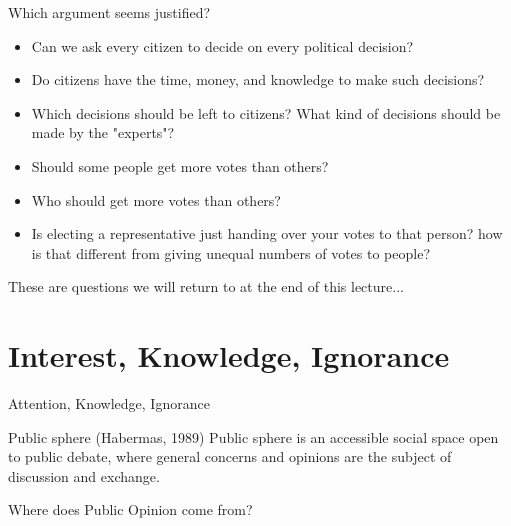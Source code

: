 \documentclass{beamer}
\begin{document}
\begin{frame}{Which argument seems justified? }
\begin{itemize}
    \item Can we ask every citizen to decide on every political decision?
    \item Do citizens have the time,  money, and knowledge to make such decisions?
    \item Which decisions should be left to citizens? What kind of decisions should be made by the "experts"?
    \item Should some people get more votes than others?
    \item Who should get more votes than others?
    \item Is electing a representative just handing over your votes to that person? how is that different from giving unequal numbers of votes to people?
\end{itemize}
\end{frame}

\begin{frame}{}
These are questions we will return to at the end of this lecture...
\end{frame}



\section{Interest, Knowledge, Ignorance}

\begin{frame}{Attention, Knowledge, Ignorance}
\begin{block}{Public sphere (Habermas, 1989) }
 Public sphere is an accessible social space open to public debate, where general concerns and opinions are the subject of discussion and exchange.
 \end{block}
\end{frame}

\begin{frame}{Where does Public Opinion come from?}
\end{frame}
\end{document}
